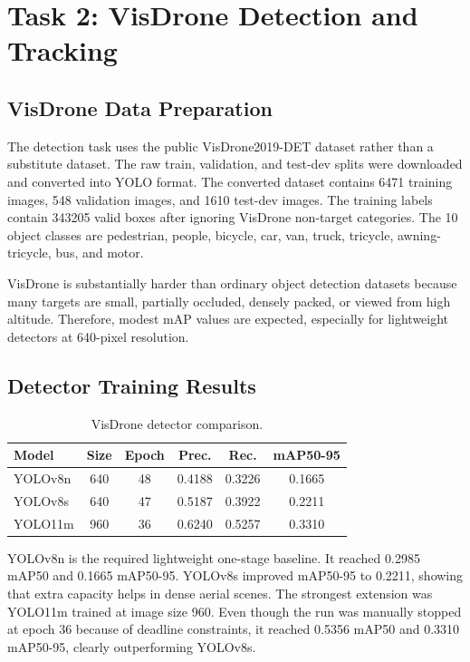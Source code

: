 \documentclass[10pt,twocolumn]{article}
\begin{document}
\section{Task 2: VisDrone Detection and Tracking}

\subsection{VisDrone Data Preparation}

The detection task uses the public VisDrone2019-DET dataset rather than a substitute dataset. The raw train, validation, and test-dev splits were downloaded and converted into YOLO format. The converted dataset contains 6471 training images, 548 validation images, and 1610 test-dev images. The training labels contain 343205 valid boxes after ignoring VisDrone non-target categories. The 10 object classes are pedestrian, people, bicycle, car, van, truck, tricycle, awning-tricycle, bus, and motor.

VisDrone is substantially harder than ordinary object detection datasets because many targets are small, partially occluded, densely packed, or viewed from high altitude. Therefore, modest mAP values are expected, especially for lightweight detectors at 640-pixel resolution.

\subsection{Detector Training Results}

\begin{table}[H]
\centering
\caption{VisDrone detector comparison.}
\label{tab:detection}
\small
\begin{tabular}{lccccc}
\toprule
Model & Size & Epoch & Prec. & Rec. & mAP50-95\\
\midrule
YOLOv8n & 640 & 48 & 0.4188 & 0.3226 & 0.1665\\
YOLOv8s & 640 & 47 & 0.5187 & 0.3922 & 0.2211\\
YOLO11m & 960 & 36 & 0.6240 & 0.5257 & 0.3310\\
\bottomrule
\end{tabular}
\end{table}

YOLOv8n is the required lightweight one-stage baseline. It reached 0.2985 mAP50 and 0.1665 mAP50-95. YOLOv8s improved mAP50-95 to 0.2211, showing that extra capacity helps in dense aerial scenes. The strongest extension was YOLO11m trained at image size 960. Even though the run was manually stopped at epoch 36 because of deadline constraints, it reached 0.5356 mAP50 and 0.3310 mAP50-95, clearly outperforming YOLOv8s.
\end{document}
